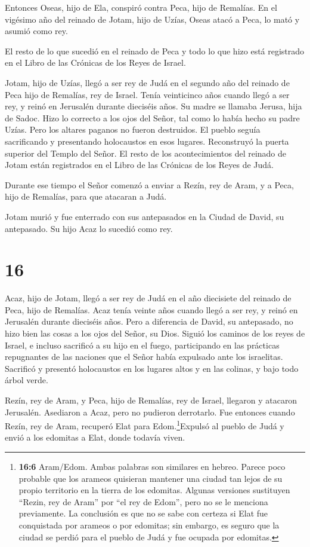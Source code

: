  Entonces Oseas, hijo de Ela, conspiró contra Peca, hijo de
Remalías. En el vigésimo año del reinado de Jotam, hijo de Uzías, Oseas
atacó a Peca, lo mató y asumió como rey.

 El resto de lo que sucedió en el reinado de Peca y todo lo
que hizo está registrado en el Libro de las Crónicas de los Reyes de
Israel.

 Jotam, hijo de Uzías, llegó a ser rey de Judá en el
segundo año del reinado de Peca hijo de Remalías, rey de Israel.
 Tenía veinticinco años cuando llegó a ser rey, y reinó en
Jerusalén durante dieciséis años. Su madre se llamaba Jerusa, hija de
Sadoc.  Hizo lo correcto a los ojos del Señor, tal como lo
había hecho su padre Uzías.  Pero los altares paganos no
fueron destruidos. El pueblo seguía sacrificando y presentando
holocaustos en esos lugares. Reconstruyó la puerta superior del Templo
del Señor.  El resto de los acontecimientos del reinado de
Jotam están registrados en el Libro de las Crónicas de los Reyes de
Judá.

 Durante ese tiempo el Señor comenzó a enviar a Rezín, rey
de Aram, y a Peca, hijo de Remalías, para que atacaran a Judá.

 Jotam murió y fue enterrado con sus antepasados en la
Ciudad de David, su antepasado. Su hijo Acaz lo sucedió como rey.

\hypertarget{section-15}{%
\section{16}\label{section-15}}

 Acaz, hijo de Jotam, llegó a ser rey de Judá en el año
diecisiete del reinado de Peca, hijo de Remalías.  Acaz
tenía veinte años cuando llegó a ser rey, y reinó en Jerusalén durante
dieciséis años. Pero a diferencia de David, su antepasado, no hizo bien
las cosas a los ojos del Señor, su Dios.  Siguió los caminos
de los reyes de Israel, e incluso sacrificó a su hijo en el fuego,
participando en las prácticas repugnantes de las naciones que el Señor
había expulsado ante los israelitas.  Sacrificó y presentó
holocaustos en los lugares altos y en las colinas, y bajo todo árbol
verde.

 Rezín, rey de Aram, y Peca, hijo de Remalías, rey de
Israel, llegaron y atacaron Jerusalén. Asediaron a Acaz, pero no
pudieron derrotarlo.  Fue entonces cuando Rezín, rey de
Aram, recuperó Elat para Edom.\footnote{\textbf{16:6} Aram/Edom. Ambas
  palabras son similares en hebreo. Parece poco probable que los arameos
  quisieran mantener una ciudad tan lejos de su propio territorio en la
  tierra de los edomitas. Algunas versiones sustituyen ``Rezin, rey de
  Aram'' por ``el rey de Edom'', pero no se le menciona previamente. La
  conclusión es que no se sabe con certeza si Elat fue conquistada por
  arameos o por edomitas; sin embargo, es seguro que la ciudad se perdió
  para el pueblo de Judá y fue ocupada por edomitas.}Expulsó al pueblo
de Judá y envió a los edomitas a Elat, donde todavía viven.

